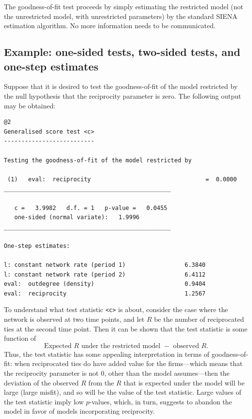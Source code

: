 \documentclass[a4paper,fleqn]{article}
\newcommand{\+}{\, + \,}
\newcommand{\SI}{{\sf SIENA }}
\begin{document}
{The goodness-of-fit test
proceeds by simply estimating the restricted model (not the unrestricted model,
with unrestricted parameters) by the standard \SI estimation algorithm. No more
information needs to be communicated.%

\subsection{Example: one-sided tests, two-sided tests, and one-step estimates}
\label{example}

Suppose that it is desired to test the goodness-of-fit of the model
restricted by the null hypothesis that the reciprocity parameter is zero.
The following output may be obtained:


\begin{verbatim}
@2
Generalised score test <c>
--------------------------

Testing the goodness-of-fit of the model restricted by

 (1)   eval:  reciprocity                                 =  0.0000
________________________________________________

   c =   3.9982   d.f. = 1   p-value =   0.0455
   one-sided (normal variate):   1.9996
________________________________________________

One-step estimates:

l: constant network rate (period 1)                 6.3840
l: constant network rate (period 2)                 6.4112
eval:  outdegree (density)                          0.9404
eval:  reciprocity                                  1.2567
\end{verbatim}
To understand what test statistic {\tt <c>} is about, consider the case
where the network is observed at two time points, and let $R$
be the number of reciprocated ties at the second time point. Then it
can be shown that the test statistic is some function of
\[
  \mbox{Expected $R$ under the restricted model } - \mbox{ observed } R.
\]
Thus, the test statistic has some appealing interpretation in terms
of goodness-of-fit: when reciprocated ties do have added value for
the firms---which means that the reciprocity parameter is not 0,
other than the model assumes---then the deviation of the observed
$R$ from the $R$ that is expected under the model will be large
(large misfit), and so will be the value of the test statistic.
Large values of the test statistic imply low $p$-values, which, in
turn, suggests to abandon the model in favor of models incorporating
reciprocity.

}
\end{document}
